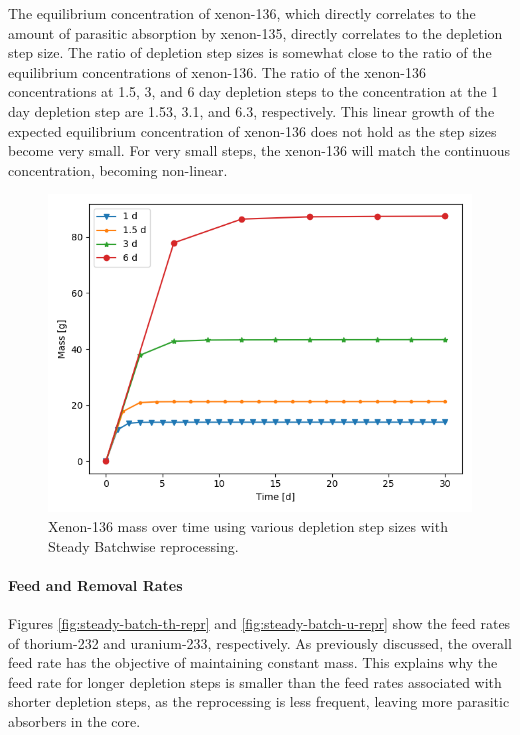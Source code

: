 The equilibrium concentration of xenon-136, which directly correlates to the amount of parasitic absorption by xenon-135, directly correlates to the depletion step size.
The ratio of depletion step sizes is somewhat close to the ratio of the equilibrium concentrations of xenon-136.
The ratio of the xenon-136 concentrations at 1.5, 3, and 6 day depletion steps to the concentration at the 1 day depletion step are 1.53, 3.1, and 6.3, respectively.
This linear growth of the expected equilibrium concentration of xenon-136 does not hold as the step sizes become very small.
For very small steps, the xenon-136 will match the continuous concentration, becoming non-linear.

\begin{figure}[H]
  \centering
  \includegraphics[scale=0.7]{images/Xe136_sp_comp.png}
  \caption{Xenon-136 mass over time using various depletion step sizes with Steady Batchwise reprocessing.}
   \label{fig:steady-batch-xe136}
\end{figure}

\paragraph*{Feed and Removal Rates}

Figures \ref{fig:steady-batch-th-repr} and \ref{fig:steady-batch-u-repr} show the feed rates of thorium-232 and uranium-233, respectively. As previously discussed, the overall feed rate has the objective of maintaining constant mass. This explains why the feed rate for longer depletion steps is smaller than the feed rates associated with shorter depletion steps, as the reprocessing is less frequent, leaving more parasitic absorbers in the core.

